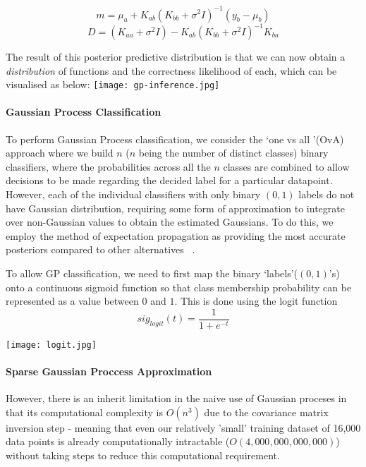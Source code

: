 \documentclass[10pt,sts]{article}
\begin{document}
\begin{multicols}{2}
    $$ m = \mu_a + K_{ab} (K_{bb} + \sigma^2I)^{-1} (y_b - \mu_b) $$
    $$ D = (K_{aa} + \sigma^2I) - K_{ab} (K_{bb}+\sigma^2I)^{-1} K_{ba} $$

    The result of this posterior predictive distribution is that we can now obtain a \textit{distribution} of functions and the correctness likelihood of each, which can be visualised as below:
    \texttt{[image: gp-inference.jpg]}

    \paragraph{Gaussian Process Classification} 
    To perform Gaussian Process classification, we consider the \lq one vs all \rq (OvA) approach where we build $n$ ($n$ being the number of distinct classes) binary classifiers, where the probabilities across all the $n$ classes are combined to allow decisions to be made regarding the decided label for a particular datapoint. However, each of the individual classifiers with only binary $(0, 1)$ labels do not have Gaussian distribution, requiring some form of approximation to integrate over non-Gaussian values to obtain the estimated Gaussians. To do this, we employ the method of expectation propagation as providing the most accurate posteriors compared to other alternatives ~\citep{nickisch08}. 

    To allow GP classification, we need to first map the binary \lq labels\rq ($(0, 1)$'s) onto a continuous sigmoid function so that class membership probability can be represented as a value between $0$ and $1$. This is done using the logit function $$sig_{logit}(t) = \frac{1}{1+e^{-t}}$$
    
    \texttt{[image: logit.jpg]}

    \paragraph {Sparse Gaussian Proccess Approximation} However, there is an inherit limitation in the naive use of Gaussian proceses in that its computational complexity is $O(n^3)$ due to the covariance matrix inversion step - meaning that even our relatively 'small' training dataset of 16,000 data points is already computationally intractable ($O(4,000,000,000,000)$) without taking steps to reduce this computational requirement.


\end{multicols}
\end{document}
